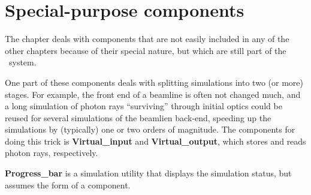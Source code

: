 \chapter{Special-purpose components}

The chapter deals with components that are not easily included
in any of the other chapters because of their special nature,
but which are still part of the \MCX\ system.

One part of these components deals with splitting simulations
into two (or more) stages. 
For example, the front end of a beamline is often not changed much, and a long simulation of photon rays
``surviving'' through initial optics could be reused
for several simulations of the beamlien back-end, speeding up
the simulations by (typically) one or two orders of magnitude.
The components for doing this trick is \textbf{Virtual\_input} and
\textbf{Virtual\_output}, which stores and reads photon rays, respectively.

\textbf{Progress\_bar} is a simulation utility that displays the simulation
status, but assumes the form of a component.

\newpage









